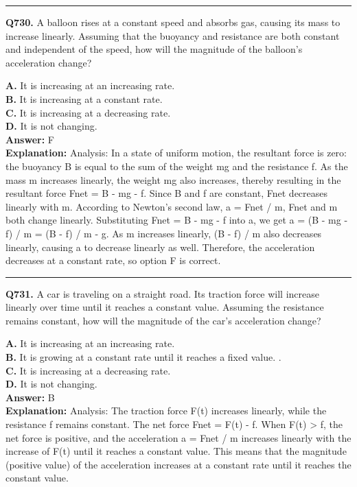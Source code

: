 \documentclass[12pt]{article}
\begin{document}
\hrule
\vspace{1em}


\noindent
\textbf{Q730.} A balloon rises at a constant speed and absorbs gas, causing its mass to increase linearly. Assuming that the buoyancy and resistance are both constant and independent of the speed, how will the magnitude of the balloon's acceleration change?



\textbf{A.} It is increasing at an increasing rate. \\
\textbf{B.} It is increasing at a constant rate. \\
\textbf{C.} It is increasing at a decreasing rate. \\
\textbf{D.} It is not changing. \\

\textbf{Answer:} F \\
\textbf{Explanation:} Analysis: In a state of uniform motion, the resultant force is zero: the buoyancy B is equal to the sum of the weight mg and the resistance f. As the mass m increases linearly, the weight mg also increases, thereby resulting in the resultant force Fnet = B - mg - f. Since B and f are constant, Fnet decreases linearly with m. According to Newton's second law, a = Fnet / m, Fnet and m both change linearly. Substituting Fnet = B - mg - f into a, we get a = (B - mg - f) / m = (B - f) / m - g. As m increases linearly, (B - f) / m also decreases linearly, causing a to decrease linearly as well. Therefore, the acceleration decreases at a constant rate, so option F is correct.

\hrule
\vspace{1em}


\noindent
\textbf{Q731.} A car is traveling on a straight road. Its traction force will increase linearly over time until it reaches a constant value. Assuming the resistance remains constant, how will the magnitude of the car's acceleration change?



\textbf{A.} It is increasing at an increasing rate. \\
\textbf{B.} It is growing at a constant rate until it reaches a fixed value.
. \\
\textbf{C.} It is increasing at a decreasing rate. \\
\textbf{D.} It is not changing. \\

\textbf{Answer:} B \\
\textbf{Explanation:} Analysis: The traction force F(t) increases linearly, while the resistance f remains constant. The net force Fnet = F(t) - f. When F(t) > f, the net force is positive, and the acceleration a = Fnet / m increases linearly with the increase of F(t) until it reaches a constant value. This means that the magnitude (positive value) of the acceleration increases at a constant rate until it reaches the constant value.
\end{document}
